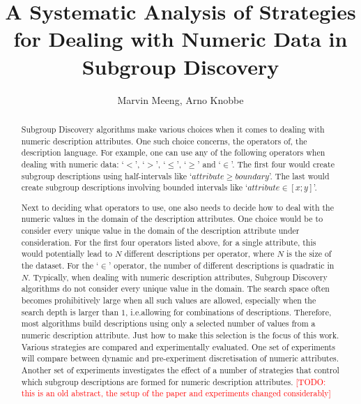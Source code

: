 \documentclass[smallextended]{svjour3}
\newcommand{\todo}[1]{\textcolor{red}{[TODO: #1]}}
\newcommand{\subgroup}[1]{\mbox{`$#1$'}}
\newcommand{\op}[1]{`$#1$'}
\begin{document}
\title{A Systematic Analysis of Strategies for Dealing with Numeric Data in Subgroup Discovery}
\author{Marvin Meeng, Arno Knobbe}
\date{}
\maketitle



\begin{abstract}
Subgroup Discovery algorithms make various choices when it comes to dealing with numeric description attributes.
One such choice concerns, the operators of, the description language.
For example, one can use any of the following operators when dealing with numeric data: \op{<}, \op{>}, \op{\leq}, \op{\geq} and \op{\in}.
The first four would create subgroup descriptions using half-intervals like \subgroup{attribute \geq boundary}.
The last would create subgroup descriptions involving bounded intervals like \subgroup{attribute \in [x;y]}.

Next to deciding what operators to use, one also needs to decide how to deal with the numeric values in the domain of the description attributes.
One choice would be to consider every unique value in the domain of the description attribute under consideration.
For the first four operators listed above, for a single attribute, this would potentially lead to $N$ different descriptions per operator, where $N$ is the size of the dataset.
For the \op{\in} operator, the number of different descriptions is quadratic in $N$.
Typically, when dealing with numeric description attributes, Subgroup Discovery algorithms do not consider every unique value in the domain.
The search space often becomes prohibitively large when all such values are allowed, especially when the search depth is larger than $1$, i.e.\@ allowing for combinations of descriptions.
Therefore, most algorithms build descriptions using only a selected number of values from a numeric description attribute.
Just how to make this selection is the focus of this work.
Various strategies are compared and experimentally evaluated.
One set of experiments will compare between dynamic and pre-experiment discretisation of numeric attributes.
Another set of experiments investigates the effect of a number of strategies that control which subgroup descriptions are formed for numeric description attributes.
\todo{this is an old abstract, the setup of the paper and experiments changed considerably}
\end{abstract}
\end{document}
